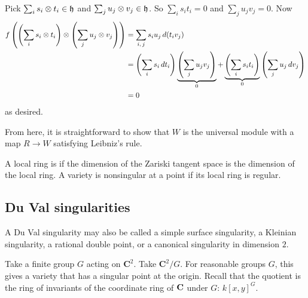 \documentclass[11pt, oneside,margin=1in]{article}
\begin{document}
Pick $\sum_{i}^{} s_i\otimes t_i\in \mathfrak{h}$ and $\sum_{j}^{} u_j\otimes v_j\in \mathfrak{h}$. So $\sum_{i}^{} s_it_i=0$ and $\sum_{j}^{} u_jv_j=0$. Now
\begin{align*}
	f \left( \left( \sum_{i}^{} s_i\otimes t_i \right)\otimes \left( \sum_{j}^{} u_j\otimes v_j \right)  \right)&= \sum_{i,\,j}^{} s_iu_j\, d(t_iv_j) \\
														   &= \left( \sum_{i}^{} s_i\, dt_i \right) \underbrace{\left( \sum_{j}^{} u_jv_j \right)}_{0} + \underbrace{\left( \sum_{i}^{} s_it_i \right)}_{0} \left( \sum_{j}^{} u_j\, dv_j \right) \\
														   &=0
\end{align*}
as desired.

From here, it is straightforward to show that $W$ is the universal module with a map $R\longrightarrow W$ satisfying Leibniz's rule.


\begin{remark}
	A local ring is  if the dimension of the Zariski tangent space is the dimension of the local ring. A variety is nonsingular at a point if its local ring is regular.
\end{remark}
\subsection{Du Val singularities}
A Du Val singularity may also be called a simple surface singularity, a Kleinian singularity, a rational double point, or a canonical singularity in dimension $2$.

Take a finite group $G$ acting on $\mathbf{C}^2$. Take $\mathbf{C}^2/G$. For reasonable groups $G$, this gives a variety that has a singular point at the origin. Recall that the quotient is the ring of invariants of the coordinate ring of $\mathbf C$ under $G$: $k[x,y]^G$. 
\end{document}
